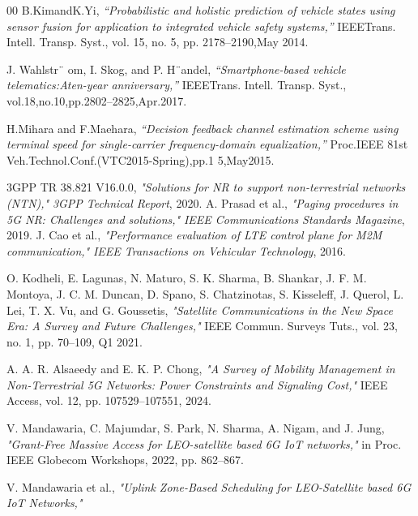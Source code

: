 \documentclass[conference]{IEEEtran}
\begin{document}
\begin{thebibliography}{00}
 B.KimandK.Yi, \textit{“Probabilistic and holistic prediction of vehicle states using sensor fusion for application to integrated vehicle safety systems,”}  IEEETrans. Intell. Transp. Syst., vol. 15, no. 5, pp. 2178–2190,May 2014.

 J. Wahlstr¨ om, I. Skog, and P. H¨andel, \textit{“Smartphone-based vehicle telematics:Aten-year anniversary,”} IEEETrans. Intell. Transp. Syst., vol.18,no.10,pp.2802–2825,Apr.2017.

 H.Mihara and F.Maehara, \textit{ “Decision feedback channel estimation scheme using terminal speed for single-carrier frequency-domain equalization,”} Proc.IEEE 81st Veh.Technol.Conf.(VTC2015-Spring),pp.1 5,May2015.


 3GPP TR 38.821 V16.0.0, \textit{"Solutions for NR to support non-terrestrial networks (NTN),"} \textit{3GPP Technical Report}, 2020.
 A. Prasad et al., \textit{"Paging procedures in 5G NR: Challenges and solutions,"} \textit{IEEE Communications Standards Magazine}, 2019.
 J. Cao et al., \textit{"Performance evaluation of LTE control plane for M2M communication,"} \textit{IEEE Transactions on Vehicular Technology}, 2016.

 O. Kodheli, E. Lagunas, N. Maturo, S. K. Sharma, B. Shankar, J. F. M. Montoya, J. C. M. Duncan, D. Spano, S. Chatzinotas, S. Kisseleff, J. Querol, L. Lei, T. X. Vu, and G. Goussetis, \textit{"Satellite Communications in the New Space Era: A Survey and Future Challenges,"} IEEE Commun. Surveys Tuts., vol. 23, no. 1, pp. 70–109, Q1 2021.

 A. A. R. Alsaeedy and E. K. P. Chong, \textit{"A Survey of Mobility Management in Non-Terrestrial 5G Networks: Power Constraints and Signaling Cost,"} IEEE Access, vol. 12, pp. 107529–107551, 2024.

 V. Mandawaria, C. Majumdar, S. Park, N. Sharma, A. Nigam, and J. Jung, \textit{"Grant-Free Massive Access for LEO-satellite based 6G IoT networks,"} in Proc. IEEE Globecom Workshops, 2022, pp. 862–867.

 V. Mandawaria et al., \textit{"Uplink Zone-Based Scheduling for LEO-Satellite based 6G IoT Networks,"} %


\end{thebibliography}
\end{document}
